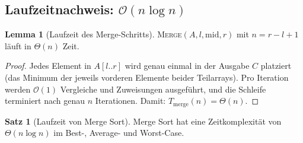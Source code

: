 ﻿\documentclass[a4paper,12pt]{article}
\theoremstyle{definition}
\newtheorem{satz}{Satz}
\newtheorem{lemma}{Lemma}
\begin{document}
\subsection{Laufzeitnachweis: $\mathcal{O}(n \log n)$}

\begin{lemma}[Laufzeit des Merge-Schritts]
    \label{lemma:merge_time}
    \textsc{Merge}$(A, l, \mathrm{mid}, r)$ mit $n = r - l + 1$ läuft in
    $\Theta(n)$ Zeit.
\end{lemma}

\begin{proof}
    Jedes Element in $A[l..r]$ wird genau einmal in der Ausgabe $C$ platziert
    (das Minimum der jeweils vorderen Elemente beider Teilarrays). Pro Iteration
    werden $\mathcal{O}(1)$ Vergleiche und Zuweisungen ausgeführt, und die Schleife
    terminiert nach genau $n$ Iterationen. Damit: $T_{\mathrm{merge}}(n) = \Theta(n)$.
    \qedhere
\end{proof}

\begin{satz}[Laufzeit von Merge Sort]
    \label{satz:ms_runtime}
    Merge Sort hat eine Zeitkomplexität von $\Theta(n \log n)$ im
    Best-, Average- und Worst-Case.
\end{satz}
\end{document}
